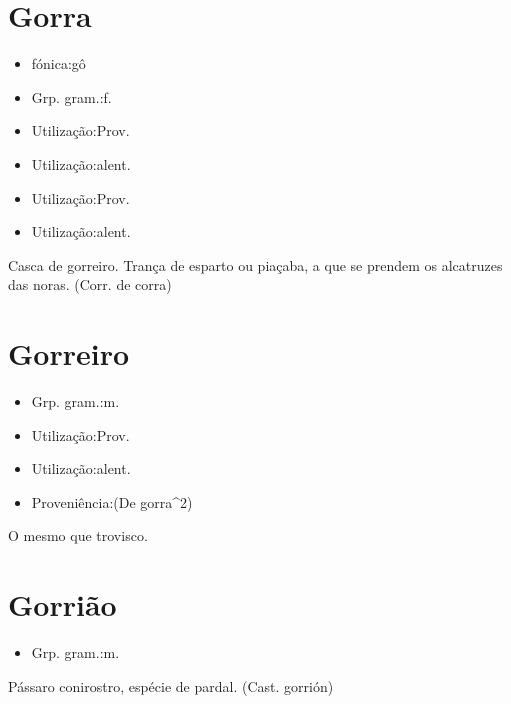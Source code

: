 \section{Gorra}
\begin{itemize}
\item {fónica:gô}
\end{itemize}
\begin{itemize}
\item {Grp. gram.:f.}
\end{itemize}
\begin{itemize}
\item {Utilização:Prov.}
\end{itemize}
\begin{itemize}
\item {Utilização:alent.}
\end{itemize}
\begin{itemize}
\item {Utilização:Prov.}
\end{itemize}
\begin{itemize}
\item {Utilização:alent.}
\end{itemize}
Casca de gorreiro.
Trança de esparto ou piaçaba, a que se prendem os alcatruzes das noras.
(Corr. de \textunderscore corra\textunderscore )
\section{Gorreiro}
\begin{itemize}
\item {Grp. gram.:m.}
\end{itemize}
\begin{itemize}
\item {Utilização:Prov.}
\end{itemize}
\begin{itemize}
\item {Utilização:alent.}
\end{itemize}
\begin{itemize}
\item {Proveniência:(De \textunderscore gorra\textunderscore ^2)}
\end{itemize}
O mesmo que \textunderscore trovisco\textunderscore .
\section{Gorrião}
\begin{itemize}
\item {Grp. gram.:m.}
\end{itemize}
Pássaro conirostro, espécie de pardal.
(Cast. \textunderscore gorrión\textunderscore )
